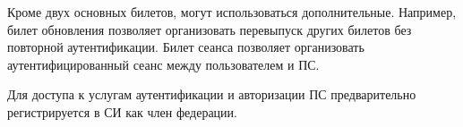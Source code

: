 Кроме двух основных билетов, могут использоваться дополнительные.
Например, билет обновления позволяет организовать перевыпуск других билетов
без повторной аутентификации. Билет сеанса позволяет организовать 
аутентифицированный сеанс между пользователем и ПС.

Для доступа к услугам аутентификации и авторизации ПС предварительно 
регистрируется в СИ как член федерации.


